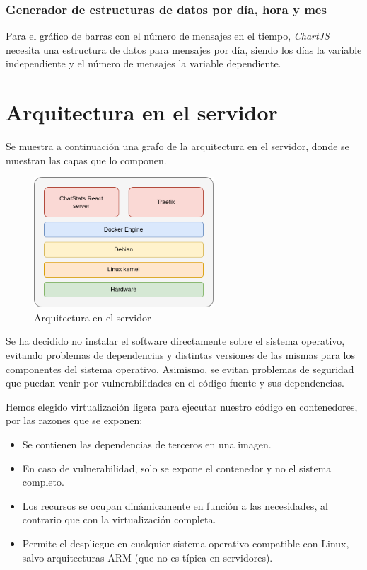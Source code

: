 
\subsubsection{Generador de estructuras de datos por día, hora y mes}

Para el gráfico de barras con el número de mensajes en el tiempo, \textit{ChartJS} necesita una estructura de datos para mensajes por día, siendo los días la variable independiente y el número de mensajes la variable dependiente.


\section{Arquitectura en el servidor}

Se muestra a continuación una grafo de la arquitectura en el servidor, donde se muestran las capas que lo componen.

\begin{figure}[H]
	\centering
	\includegraphics[width=0.6\textwidth]{img/server.png}
	\caption{Arquitectura en el servidor}
	\label{fig:chap4:architecture_server}
\end{figure}

Se ha decidido no instalar el software directamente sobre el sistema operativo, evitando problemas de dependencias y distintas versiones de las mismas para los componentes del sistema operativo. Asimismo, se evitan problemas de seguridad que puedan venir por vulnerabilidades en el código fuente y sus dependencias.

Hemos elegido virtualización ligera para ejecutar nuestro código en contenedores, por las razones que se exponen:

\begin{itemize}
	\item Se contienen las dependencias de terceros en una imagen.
	\item En caso de vulnerabilidad, solo se expone el contenedor y no el sistema completo.
	\item Los recursos se ocupan dinámicamente en función a las necesidades, al contrario que con la virtualización completa.
	\item Permite el despliegue en cualquier sistema operativo compatible con Linux, salvo arquitecturas ARM (que no es típica en servidores).
\end{itemize}

